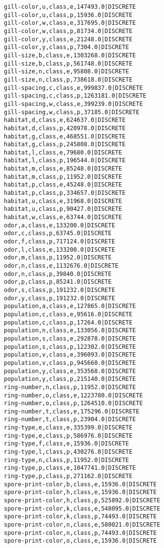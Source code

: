 \begin{lstlisting}
gill-color,u,class,e,147493.0|DISCRETE	
gill-color,u,class,p,15936.0|DISCRETE	
gill-color,w,class,e,317695.0|DISCRETE	
gill-color,w,class,p,81734.0|DISCRETE	
gill-color,y,class,e,21248.0|DISCRETE	
gill-color,y,class,p,7304.0|DISCRETE	
gill-size,b,class,e,1303268.0|DISCRETE	
gill-size,b,class,p,561748.0|DISCRETE	
gill-size,n,class,e,95808.0|DISCRETE	
gill-size,n,class,p,738618.0|DISCRETE	
gill-spacing,c,class,e,999837.0|DISCRETE	
gill-spacing,c,class,p,1263181.0|DISCRETE	
gill-spacing,w,class,e,399239.0|DISCRETE	
gill-spacing,w,class,p,37185.0|DISCRETE	
habitat,d,class,e,624637.0|DISCRETE	
habitat,d,class,p,420978.0|DISCRETE	
habitat,g,class,e,468551.0|DISCRETE	
habitat,g,class,p,245808.0|DISCRETE	
habitat,l,class,e,79680.0|DISCRETE	
habitat,l,class,p,196544.0|DISCRETE	
habitat,m,class,e,85248.0|DISCRETE	
habitat,m,class,p,11952.0|DISCRETE	
habitat,p,class,e,45248.0|DISCRETE	
habitat,p,class,p,334657.0|DISCRETE	
habitat,u,class,e,31968.0|DISCRETE	
habitat,u,class,p,90427.0|DISCRETE	
habitat,w,class,e,63744.0|DISCRETE	
odor,a,class,e,133200.0|DISCRETE	
odor,c,class,p,63745.0|DISCRETE	
odor,f,class,p,717124.0|DISCRETE	
odor,l,class,e,133200.0|DISCRETE	
odor,m,class,p,11952.0|DISCRETE	
odor,n,class,e,1132676.0|DISCRETE	
odor,n,class,p,39840.0|DISCRETE	
odor,p,class,p,85241.0|DISCRETE	
odor,s,class,p,191232.0|DISCRETE	
odor,y,class,p,191232.0|DISCRETE	
population,a,class,e,127865.0|DISCRETE	
population,c,class,e,95616.0|DISCRETE	
population,c,class,p,17264.0|DISCRETE	
population,n,class,e,133056.0|DISCRETE	
population,s,class,e,292878.0|DISCRETE	
population,s,class,p,122302.0|DISCRETE	
population,v,class,e,396093.0|DISCRETE	
population,v,class,p,945660.0|DISCRETE	
population,y,class,e,353568.0|DISCRETE	
population,y,class,p,215140.0|DISCRETE	
ring-number,n,class,p,11952.0|DISCRETE	
ring-number,o,class,e,1223780.0|DISCRETE	
ring-number,o,class,p,1264510.0|DISCRETE	
ring-number,t,class,e,175296.0|DISCRETE	
ring-number,t,class,p,23904.0|DISCRETE	
ring-type,e,class,e,335399.0|DISCRETE	
ring-type,e,class,p,586976.0|DISCRETE	
ring-type,f,class,e,15936.0|DISCRETE	
ring-type,l,class,p,430276.0|DISCRETE	
ring-type,n,class,p,11952.0|DISCRETE	
ring-type,p,class,e,1047741.0|DISCRETE	
ring-type,p,class,p,271162.0|DISCRETE	
spore-print-color,b,class,e,15936.0|DISCRETE	
spore-print-color,h,class,e,15936.0|DISCRETE	
spore-print-color,h,class,p,525892.0|DISCRETE	
spore-print-color,k,class,e,548095.0|DISCRETE	
spore-print-color,k,class,p,74493.0|DISCRETE	
spore-print-color,n,class,e,580021.0|DISCRETE	
spore-print-color,n,class,p,74493.0|DISCRETE	
spore-print-color,o,class,e,15936.0|DISCRETE	

\end{lstlisting}
